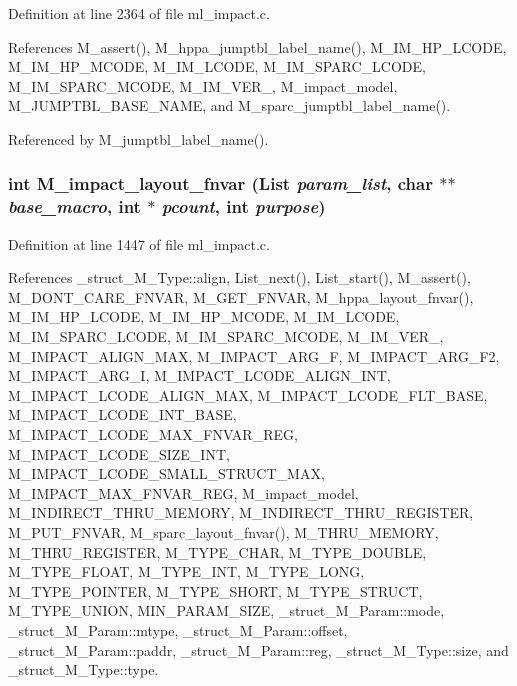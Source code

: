 Definition at line 2364 of file ml\_\-impact.c.

References M\_\-assert(), M\_\-hppa\_\-jumptbl\_\-label\_\-name(), M\_\-IM\_\-HP\_\-LCODE, M\_\-IM\_\-HP\_\-MCODE, M\_\-IM\_\-LCODE, M\_\-IM\_\-SPARC\_\-LCODE, M\_\-IM\_\-SPARC\_\-MCODE, M\_\-IM\_\-VER\_, M\_\-impact\_\-model, M\_\-JUMPTBL\_\-BASE\_\-NAME, and M\_\-sparc\_\-jumptbl\_\-label\_\-name().

Referenced by M\_\-jumptbl\_\-label\_\-name().
\subsubsection{\setlength{\rightskip}{0pt plus 5cm}int M\_\-impact\_\-layout\_\-fnvar (\bf{List} {\em param\_\-list}, char $\ast$$\ast$ {\em base\_\-macro}, int $\ast$ {\em pcount}, int {\em purpose})}\label{m__impact_8h_1a7e47bb95219eb03a444e58530d142c}




Definition at line 1447 of file ml\_\-impact.c.

References \_\-struct\_\-M\_\-Type::align, List\_\-next(), List\_\-start(), M\_\-assert(), M\_\-DONT\_\-CARE\_\-FNVAR, M\_\-GET\_\-FNVAR, M\_\-hppa\_\-layout\_\-fnvar(), M\_\-IM\_\-HP\_\-LCODE, M\_\-IM\_\-HP\_\-MCODE, M\_\-IM\_\-LCODE, M\_\-IM\_\-SPARC\_\-LCODE, M\_\-IM\_\-SPARC\_\-MCODE, M\_\-IM\_\-VER\_, M\_\-IMPACT\_\-ALIGN\_\-MAX, M\_\-IMPACT\_\-ARG\_\-F, M\_\-IMPACT\_\-ARG\_\-F2, M\_\-IMPACT\_\-ARG\_\-I, M\_\-IMPACT\_\-LCODE\_\-ALIGN\_\-INT, M\_\-IMPACT\_\-LCODE\_\-ALIGN\_\-MAX, M\_\-IMPACT\_\-LCODE\_\-FLT\_\-BASE, M\_\-IMPACT\_\-LCODE\_\-INT\_\-BASE, M\_\-IMPACT\_\-LCODE\_\-MAX\_\-FNVAR\_\-REG, M\_\-IMPACT\_\-LCODE\_\-SIZE\_\-INT, M\_\-IMPACT\_\-LCODE\_\-SMALL\_\-STRUCT\_\-MAX, M\_\-IMPACT\_\-MAX\_\-FNVAR\_\-REG, M\_\-impact\_\-model, M\_\-INDIRECT\_\-THRU\_\-MEMORY, M\_\-INDIRECT\_\-THRU\_\-REGISTER, M\_\-PUT\_\-FNVAR, M\_\-sparc\_\-layout\_\-fnvar(), M\_\-THRU\_\-MEMORY, M\_\-THRU\_\-REGISTER, M\_\-TYPE\_\-CHAR, M\_\-TYPE\_\-DOUBLE, M\_\-TYPE\_\-FLOAT, M\_\-TYPE\_\-INT, M\_\-TYPE\_\-LONG, M\_\-TYPE\_\-POINTER, M\_\-TYPE\_\-SHORT, M\_\-TYPE\_\-STRUCT, M\_\-TYPE\_\-UNION, MIN\_\-PARAM\_\-SIZE, \_\-struct\_\-M\_\-Param::mode, \_\-struct\_\-M\_\-Param::mtype, \_\-struct\_\-M\_\-Param::offset, \_\-struct\_\-M\_\-Param::paddr, \_\-struct\_\-M\_\-Param::reg, \_\-struct\_\-M\_\-Type::size, and \_\-struct\_\-M\_\-Type::type.


